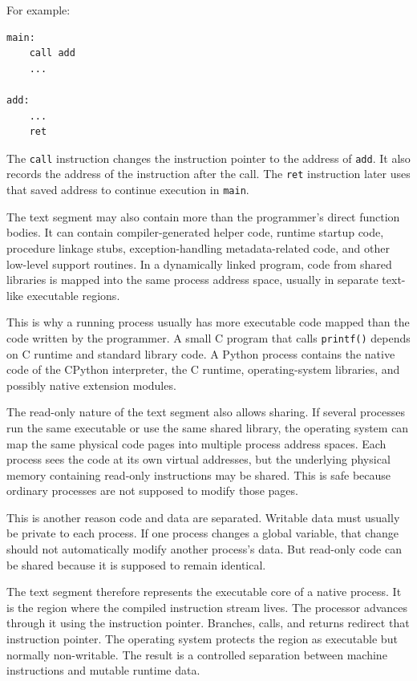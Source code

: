 For example:

\begin{verbatim}
main:
    call add
    ...

add:
    ...
    ret
\end{verbatim}

The \texttt{call} instruction changes the instruction pointer to the address of \texttt{add}. It also records the address of the instruction after the call. The \texttt{ret} instruction later uses that saved address to continue execution in \texttt{main}.

The text segment may also contain more than the programmer's direct function bodies. It can contain compiler-generated helper code, runtime startup code, procedure linkage stubs, exception-handling metadata-related code, and other low-level support routines. In a dynamically linked program, code from shared libraries is mapped into the same process address space, usually in separate text-like executable regions.

This is why a running process usually has more executable code mapped than the code written by the programmer. A small C program that calls \texttt{printf()} depends on C runtime and standard library code. A Python process contains the native code of the CPython interpreter, the C runtime, operating-system libraries, and possibly native extension modules.

The read-only nature of the text segment also allows sharing. If several processes run the same executable or use the same shared library, the operating system can map the same physical code pages into multiple process address spaces. Each process sees the code at its own virtual addresses, but the underlying physical memory containing read-only instructions may be shared. This is safe because ordinary processes are not supposed to modify those pages.

This is another reason code and data are separated. Writable data must usually be private to each process. If one process changes a global variable, that change should not automatically modify another process's data. But read-only code can be shared because it is supposed to remain identical.

The text segment therefore represents the executable core of a native process. It is the region where the compiled instruction stream lives. The processor advances through it using the instruction pointer. Branches, calls, and returns redirect that instruction pointer. The operating system protects the region as executable but normally non-writable. The result is a controlled separation between machine instructions and mutable runtime data.


